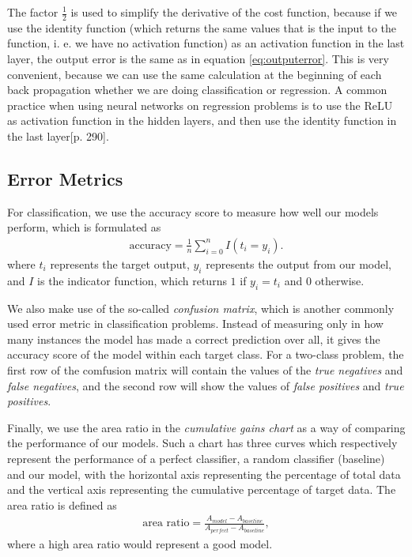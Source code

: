 The factor \(\frac{1}{2}\) is used to simplify the derivative of the
cost function, because if we use the identity function (which returns
the same values that is the input to the function, i. e. we have no activation function) as an activation
function in the last layer, the output error is the same as in equation
\ref{eq:outputerror}. This is very convenient, because we can use the same
calculation at the beginning of each back propagation whether we are doing classification or regression. A common
practice when using neural networks on regression problems is to use the
ReLU as activation function in the hidden layers, and then use the
identity function in the last layer\cite{geron}[p. 290].



\subsection{Error Metrics}

For classification, we use the accuracy score to measure how well our models perform, which is formulated as
\begin{align}
    \text{accuracy} = \frac{1}{n}\sum_{i=0}^n I(t_i = y_i).
\end{align}
where $t_i$ represents the target output, $y_i$ represents the output from our model, and $I$ is the indicator function, which returns $1$ if $y_i = t_i$ and $0$ otherwise.

We also make use of the so-called \textit{confusion matrix}, which is another commonly used error metric in classification problems. Instead of measuring only in how many instances the model has made a correct prediction over all, it gives the accuracy score of the model within each target class. For a two-class problem, the first row of the comfusion matrix will contain the values of the \textit{true negatives} and \textit{false negatives}, and the second row will show the values of \textit{false positives} and \textit{true positives}.

Finally, we use the area ratio in the \textit{cumulative gains chart} as a way of comparing the performance of our models. Such a chart has three curves which respectively represent the performance of a perfect classifier, a random classifier (baseline) and our model, with the horizontal axis representing the percentage of total data and the vertical axis representing the cumulative percentage of target data. The area ratio is defined as
\begin{align}
    \text{area ratio}=\frac{A_{model} - A_{baseline}}{A_{perfect} - A_{baseline}},
\end{align}
where a high area ratio would represent a good model.


